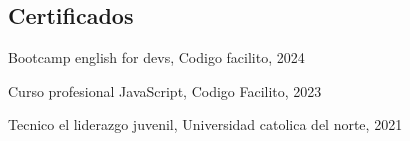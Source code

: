 \begin{CVsidebar}
    \LngTextILR
    
    
    
    \dotline
    
    
    
    \section{Certificados}
    \begin{itemlist}
        \item Bootcamp english for devs, Codigo facilito, 2024 
        \item Curso profesional JavaScript, Codigo Facilito, 2023
        \item Tecnico el liderazgo juvenil, Universidad catolica del norte, 2021
    \end{itemlist}
    
    
    
    
    
    
    \end{CVsidebar}